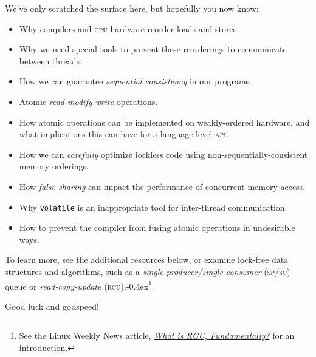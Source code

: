 \documentclass[fontsize=\bodyfontsize, numbers=endperiod]{scrartcl}
\newcommand{\punckern}{\kern-0.4ex}
\newcommand{\monobox}[1]{\mbox{\texttt{#1}}}
\newcommand{\keyword}[1]{\monobox{\color{darkGreen}#1}}
\newcommand{\introduce}[1]{\textit{#1}}
\begin{document}
\begin{multicols}{2}
We've only scratched the surface here,
but hopefully you now know:
\begin{itemize}
\item Why compilers and \textsc{cpu} hardware reorder loads and stores.
\item Why we need special tools to prevent these reorderings
    to communicate between threads.
\item How we can guarantee \introduce{sequential consistency} in our programs.
\item Atomic \introduce{read-modify-write} operations.
\item How atomic operations can be implemented on weakly-ordered hardware,
    and what implications this can have for a language-level \textsc{api}.
\item How we can \emph{carefully} optimize lockless code using
    non-sequentially-consistent memory orderings.
\item How \introduce{false sharing} can impact the performance of
    concurrent memory access.
\item Why \keyword{volatile} is an inappropriate tool for inter-thread
    communication.
\item How to prevent the compiler from fusing atomic operations in undesirable
    ways.
\end{itemize}
To learn more, see the additional resources below,
or examine lock-free data structures and algorithms,
such as a \introduce{single-producer/single-consumer}
\textsc{(sp/sc)} queue or \introduce{read-copy-update}
\textsc{(rcu)}.\punckern\footnote{See the Linux Weekly News article,
\href{https://lwn.net/Articles/262464/}{\textit{What is RCU, Fundamentally?}}
for an introduction.}

\vspace{\baselineskip}
\noindent Good luck and godspeed!
\ifebook
\else
\end{multicols}
\fi
\newpage

\appendix
\setcounter{secnumdepth}{0}
\setfootnoterule{0pt}
\end{document}
